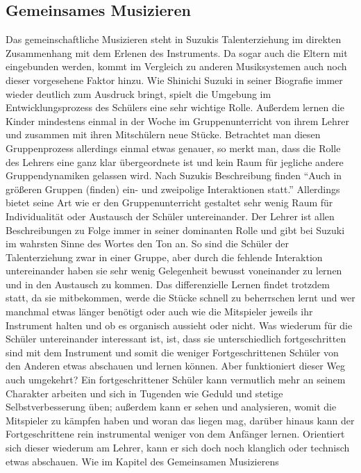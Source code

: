 \subsection{Gemeinsames Musizieren}
Das gemeinschaftliche Musizieren steht in Suzukis Talenterziehung im direkten
Zusammenhang mit dem Erlenen des Instruments. Da sogar auch die Eltern mit
eingebunden werden, kommt im Vergleich zu anderen Musiksystemen auch noch dieser
vorgesehene Faktor hinzu. Wie Shinichi Suzuki in seiner Biografie immer wieder
deutlich zum Ausdruck bringt, spielt die Umgebung im Entwicklungsprozess des
Schülers eine sehr wichtige Rolle. Außerdem lernen die Kinder mindestens einmal
in der Woche im Gruppenunterricht von ihrem Lehrer und zusammen mit ihren
Mitschülern neue Stücke. Betrachtet man diesen Gruppenprozess allerdings einmal
etwas genauer, so merkt man, dass die Rolle des Lehrers eine ganz klar
übergeordnete ist und kein Raum für jegliche andere Gruppendynamiken gelassen
wird. Nach Suzukis Beschreibung finden \enquote{Auch in größeren Gruppen (finden) ein-
und zweipolige Interaktionen statt.} \autocite[30]{suzuki:erziehung_ist_liebe}
Allerdings bietet seine Art wie er den Gruppenunterricht gestaltet sehr wenig
Raum für Individualität oder Austausch der Schüler untereinander. Der Lehrer ist
allen Beschreibungen zu Folge immer in seiner dominanten Rolle und gibt bei
Suzuki im wahrsten Sinne des Wortes den Ton an. So sind die Schüler der
Talenterziehung zwar in einer Gruppe, aber durch die fehlende Interaktion
untereinander haben sie sehr wenig Gelegenheit bewusst voneinander zu lernen und
in den Austausch zu kommen. Das differenzielle Lernen findet trotzdem statt, da
sie mitbekommen, werde die Stücke schnell zu beherrschen lernt und wer manchmal
etwas länger benötigt oder auch wie die Mitspieler jeweils ihr Instrument halten
und ob es organisch aussieht oder nicht. Was wiederum für die Schüler
untereinander interessant ist, ist, dass sie unterschiedlich fortgeschritten
sind mit dem Instrument und somit die weniger Fortgeschrittenen Schüler von den
Anderen etwas abschauen und lernen können. Aber funktioniert dieser Weg auch
umgekehrt? Ein fortgeschrittener Schüler kann vermutlich mehr an seinem
Charakter arbeiten und sich in Tugenden wie Geduld und stetige
Selbstverbesserung üben; außerdem kann er sehen und analysieren, womit die
Mitspieler zu kämpfen haben und woran das liegen mag, darüber hinaus kann
der Fortgeschrittene rein instrumental weniger von dem Anfänger lernen.
Orientiert sich dieser wiederum am Lehrer, kann er sich doch noch klanglich oder
technisch etwas abschauen. Wie im Kapitel des Gemeinsamen Musizierens
